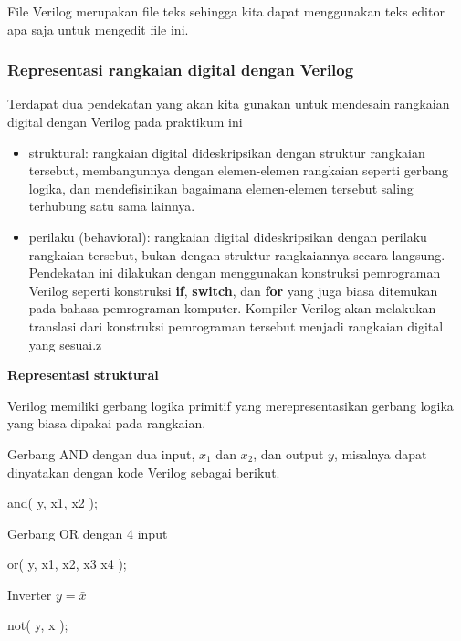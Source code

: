 File Verilog merupakan file teks sehingga kita dapat menggunakan
teks editor apa saja untuk mengedit file ini.

\subsubsection{Representasi rangkaian digital dengan Verilog}

Terdapat dua pendekatan yang akan kita gunakan untuk mendesain rangkaian
digital dengan Verilog pada praktikum ini
\begin{itemize}

\item struktural: rangkaian digital dideskripsikan dengan struktur
rangkaian tersebut, membangunnya
dengan elemen-elemen rangkaian seperti gerbang logika, dan mendefisinikan
bagaimana elemen-elemen tersebut saling terhubung satu sama lainnya.

\item perilaku (behavioral): rangkaian digital dideskripsikan dengan
perilaku rangkaian tersebut, bukan dengan struktur rangkaiannya secara
langsung. Pendekatan ini dilakukan dengan menggunakan konstruksi
pemrograman Verilog seperti konstruksi \textbf{if}, \textbf{switch}, dan
\textbf{for} yang juga biasa ditemukan pada bahasa
pemrograman komputer. Kompiler Verilog akan melakukan translasi
dari konstruksi pemrograman tersebut menjadi rangkaian digital yang sesuai.z

\end{itemize}


\textbf{Representasi struktural}

Verilog memiliki gerbang logika primitif yang merepresentasikan
gerbang logika yang biasa dipakai pada rangkaian.

Gerbang AND dengan dua input, $x_1$ dan $x_2$,
dan output $y$, misalnya dapat dinyatakan dengan kode Verilog
sebagai berikut.
\begin{verilogcode}
and( y, x1, x2 );
\end{verilogcode}

Gerbang OR dengan 4 input
\begin{verilogcode}
or( y, x1, x2, x3 x4 );
\end{verilogcode}

Inverter $y = \bar{x}$
\begin{verilogcode}
not( y, x );
\end{verilogcode}

